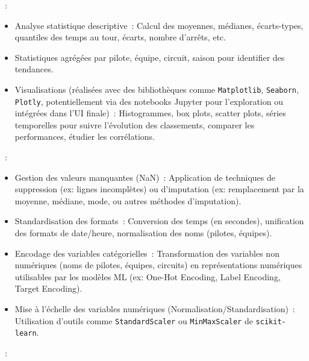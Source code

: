 \documentclass[11pt, a4paper]{article}
\newcommand{\lib}[1]{\texttt{#1}}
\begin{document}
\begin{description}[style=standard, itemsep=0.5em, leftmargin=1.5em]
    \item[Analyse Exploratoire des Données (EDA)]~:
    \begin{itemize}[label=\textbullet, itemsep=0.2em, leftmargin=*]
        \item Analyse statistique descriptive~: Calcul des moyennes, médianes, écarts-types, quantiles des temps au tour, écarts, nombre d'arrêts, etc.
        \item Statistiques agrégées par pilote, équipe, circuit, saison pour identifier des tendances. %
        \item Visualisations (réalisées avec des bibliothèques comme \lib{Matplotlib}, \lib{Seaborn}, \lib{Plotly}, potentiellement via des notebooks Jupyter pour l'exploration ou intégrées dans l'UI finale)~: Histogrammes, box plots, scatter plots, séries temporelles pour suivre l'évolution des classements, comparer les performances, étudier les corrélations.
    \end{itemize}
    \item[Nettoyage et Prétraitement]~:
    \begin{itemize}[label=\textbullet, itemsep=0.2em, leftmargin=*]
        \item Gestion des valeurs manquantes (NaN)~: Application de techniques de suppression (ex: lignes incomplètes) ou d'imputation (ex: remplacement par la moyenne, médiane, mode, ou autres méthodes d'imputation). %
        \item Standardisation des formats~: Conversion des temps (en secondes), unification des formats de date/heure, normalisation des noms (pilotes, équipes).
        \item Encodage des variables catégorielles~: Transformation des variables non numériques (noms de pilotes, équipes, circuits) en représentations numériques utilisables par les modèles ML (ex: One-Hot Encoding, Label Encoding, Target Encoding).
        \item Mise à l'échelle des variables numériques (Normalisation/Standardisation)~: Utilisation d'outils comme \lib{StandardScaler} ou \lib{MinMaxScaler} de \lib{scikit-learn}.
    \end{itemize}
    \item[Ingénierie de Caractéristiques (Feature Engineering)]~:
    \begin{itemize}[label=\textbullet, itemsep=0.2em, leftmargin=*]

\end{itemize}
\end{description}
\end{document}
